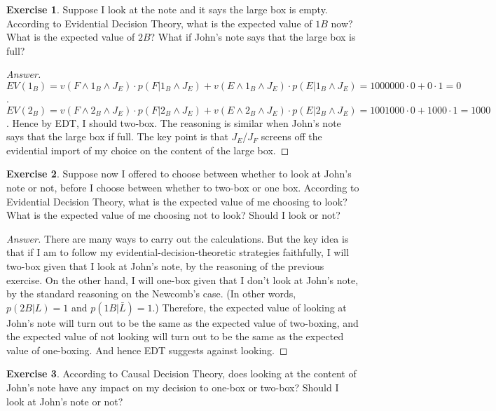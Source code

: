 \documentclass[11pt]{article}
\theoremstyle{definition}
\newtheorem{exer}{Exercise}
\begin{document}
\begin{exer}
Suppose I look at the note and it says the large box is empty. According to Evidential Decision Theory, what is the expected value of $1B$ now? What is the expected value of $2B$?  What if John's note says that the large box is full?
\end{exer}


\begin{proof}[Answer]
$EV(1_B) = v(F \land 1_B \land J_E)\cdot p(F|1_B \land J_E) + v(E \land 1_B \land J_E)\cdot p(E|1_B \land J_E) = 1000000 \cdot 0 + 0 \cdot 1 = 0$. \\
$EV(2_B) = v(F \land 2_B \land J_E)\cdot p(F|2_B \land J_E) + v(E \land 2_B \land J_E)\cdot p(E|2_B \land J_E) = 1001000 \cdot 0 + 1000 \cdot 1 = 1000$.
Hence by EDT, I should two-box. The reasoning is similar when John's note says that the large box if full. The key point is that $J_E$/$J_F$ screens off the evidential import of my choice on the content of the large box.

\end{proof}

\begin{exer}
Suppose now I offered to choose between whether to look at John's note or not, before I choose between whether to two-box or one box. According to Evidential Decision Theory, what is the expected value of me choosing to look? What is the expected value of me choosing not to look? Should I look or not?

\end{exer}


\begin{proof}[Answer]
There are many ways to carry out the calculations. But the key idea is that if I am to follow my evidential-decision-theoretic strategies faithfully, I will two-box given that I look at John's note, by the reasoning of the previous exercise. On the other hand, I will one-box given that I don't look at John's note, by the standard reasoning on the Newcomb's case. (In other words, $p(2B | L) = 1$ and $p(1B | \bar{L}) = 1$.) Therefore, the expected value of looking at John's note will turn out to be the same as the expected value of two-boxing, and the expected value of not looking will turn out to be the same as the expected value of one-boxing. And hence EDT suggests against looking.


\end{proof}

\begin{exer}
According to Causal Decision Theory, does looking at the content of John's note have any impact on my decision to one-box or two-box? Should I look at John's note or not?

\end{exer}
\end{document}
